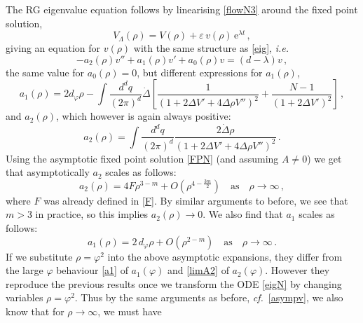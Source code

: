 \documentclass[11pt,a4paper]{article}
\numberwithin{figure}{section}
\numberwithin{equation}{section}
\newcommand\ie{\textit{i.e.}\ }
\newcommand\cf{\textit{cf.}\ }
\newcommand{\ph}{\varphi}
\newcommand{\e}{\text{e}}
\begin{document}
The RG eigenvalue equation follows by linearising \eqref{flowN3} around the fixed point solution,
\begin{equation} \label{linearN}
    V_\Lambda(\rho) = V(\rho) + \varepsilon\, v(\rho)\, \e^{\lambda t} \,, 
\end{equation}
giving an equation for $v(\rho)$ with the same structure as \eqref{eig}, \ie
\begin{equation} \label{eigN}
    -a_2(\rho) v'' + a_1(\rho) v' + a_0(\rho) v = (d-\lambda) v \,,
\end{equation}
the same value for $a_0(\rho) = 0$, but different expressions for $a_1(\rho)$,
\begin{equation} \label{a1N}
    a_1(\rho) = 2 d_\varphi \rho - \int \frac{d^d q}{(2\pi)^d} \dot{\Delta} \left[ \frac{1}{\left( 1 + 2 \Delta V' + 4 \Delta \rho V'' \right)^2} + \frac{N-1}{\left( 1 + 2 \Delta V' \right)^2} \right]\,,
\end{equation}
and $a_2(\rho)$, which however is again always positive:
\begin{equation} \label{a2N}
    a_2(\rho) = \int \frac{d^d q}{(2\pi)^d}  \frac{2\dot{\Delta}\rho}{\left( 1 + 2 \Delta V' + 4 \Delta \rho V'' \right)^2}\,.
\end{equation}
Using the asymptotic fixed point solution \eqref{FPN} (and assuming $A\ne0$) we get that asymptotically $a_2$ scales as follows: 
\begin{equation}
\label{a2Nasymp}
    a_2(\rho) = 4F\rho^{3-m}  +O\left(\rho^{4-\frac{3m}{2}}\right) \quad \text{as} \quad \rho \rightarrow \infty \,,
\end{equation}
where $F$ was already defined in \eqref{F}. By similar arguments to before, we see that $m>3$ in practice, so this implies $a_2(\rho)\to0$.
We also find that $a_1$ scales as follows:
\begin{equation}
\label{a1Nasymp}
    a_1(\rho) = 2\, d_\varphi \rho + O\left(\rho^{2-m}\right) \quad \text{as} \quad \rho \rightarrow \infty \,.
\end{equation}
If we substitute $\rho=\ph^2$ into the above asymptotic expansions, they differ from the large $\ph$ behaviour \eqref{a1} of $a_1(\ph)$ and \eqref{limA2} of $a_2(\ph)$. However they reproduce the previous results once we transform the ODE \eqref{eigN} by changing variables $\rho=\ph^2$. Thus by the same arguments as before, \cf \eqref{asympv}, we also know that for $\rho\to\infty$, we must have
\end{document}
